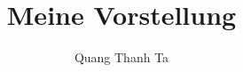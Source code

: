 \documentclass{scrartcl}	%
\title{ Meine Vorstellung }
\author{ Quang Thanh Ta }
\date{}
\begin{document}
\maketitle

\Blinddocument
\end{document}
